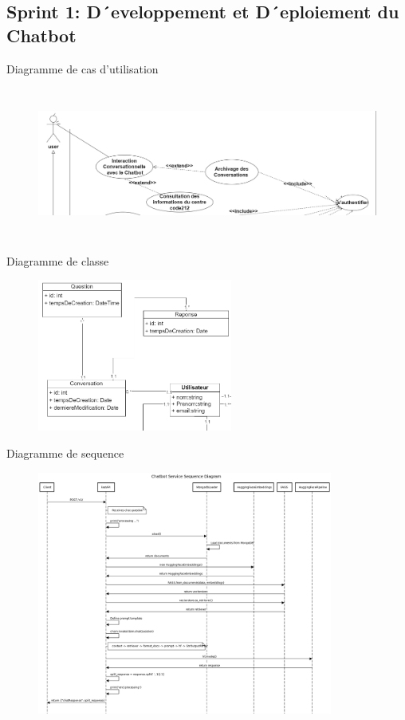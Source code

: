 \documentclass{beamer}
\begin{document}
\subsection{Sprint 1: D´eveloppement et D´eploiement du Chatbot}
\begin{frame}{Diagramme de cas d'utilisation}

\begin{figure}[htpb]
        \centering
        \includegraphics[height=5cm]{pic/sprint1-usecase.png}
\end{figure}
\end{frame}

\begin{frame}{Diagramme de classe}

\begin{figure}[htpb]
        \centering
        \includegraphics[height=5cm]{pic/sprint1-class.png}
\end{figure}
\end{frame}

\begin{frame}{Diagramme de sequence}
\begin{figure}[htpb]
        \centering
        \includegraphics[height=8cm]{pic/chatbot-seq.png}
\end{figure}
\end{frame}
\end{document}
